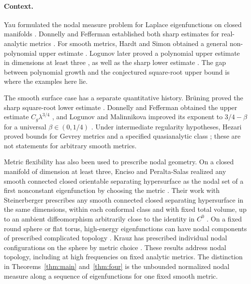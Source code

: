 \paragraph{Context.}
Yau formulated the nodal measure problem for Laplace eigenfunctions on
closed manifolds \cite{Yau1982}. Donnelly and Fefferman established both
sharp estimates for real-analytic metrics
\cite[Theorem~1.2]{DonnellyFefferman1988}.
For smooth metrics, Hardt and Simon obtained a general non-polynomial
upper estimate \cite[Section~5]{HardtSimon1989}. Logunov later proved
a polynomial upper estimate in dimensions at least three
\cite{LogunovUpper2018}, as well as the sharp lower estimate
\cite[Theorem~1.1]{LogunovLower2018}. The gap between polynomial growth
and the conjectured square-root upper bound is where the examples here lie.

The smooth surface case has a separate quantitative history.
Br\"uning proved the sharp square-root lower estimate
\cite[Satz~2]{Bruning1978}. Donnelly and Fefferman obtained the upper
estimate $C_g\lambda^{3/4}$ \cite{DonnellyFefferman1990}, and Logunov
and Malinnikova improved its exponent to $3/4-\beta$ for a universal
$\beta\in(0,1/4)$ \cite{LogunovMalinnikova2018}.
Under intermediate regularity hypotheses, Hezari proved bounds for
Gevrey metrics and a specified quasianalytic class
\cite[preprint version, Theorems~1.1 and~1.2]{Hezari2023}; these are not statements for
arbitrary smooth metrics.

Metric flexibility has also been used to prescribe nodal geometry.
On a closed manifold of dimension at least three, Enciso and Peralta-Salas
realized any smooth connected closed orientable separating hypersurface
as the nodal set of a first nonconstant eigenfunction by choosing the metric
\cite[preprint version, Theorem~1.1]{EncisoPeraltaSalas2015}.
Their work with Steinerberger prescribes any smooth connected closed
separating hypersurface in the same dimensions, within each conformal class
and with fixed total volume, up to an ambient diffeomorphism arbitrarily
close to the identity in $C^0$
\cite[preprint version, Theorem~1.1]{EncisoPeraltaSalasSteinerberger2017}.
On a fixed round sphere or flat torus, high-energy eigenfunctions can
have nodal components of prescribed complicated topology
\cite{EncisoPeraltaSalasTorres2018}. Krauz has prescribed individual
nodal configurations on the sphere by metric choice \cite{Krauz2025}.
These results address nodal topology, including at high frequencies on
fixed analytic metrics. The distinction in Theorems~\ref{thm:main}
and~\ref{thm:four} is the unbounded normalized nodal measure along a
sequence of eigenfunctions for one fixed smooth metric.

